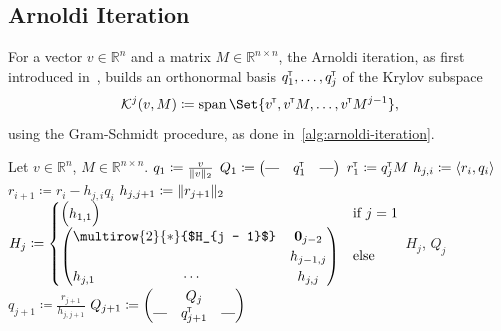 \documentclass[runningheads]{llncs}
\newcommand*{\bbR}{\mathbb{R}}
\newcommand*{\hpipe}{\rotatebox[origin=c]{90}{$|$}}
\newcommand*{\transp}{^{\mkern-1.5mu{\scriptscriptstyle\mathsf{T}}}}
\DeclareMathOperator{\spn}{span}
\DeclarePairedDelimiter{\norm}{\lVert}{\rVert}
\DeclarePairedDelimiter{\inp}{\langle}{\rangle}
\begin{document}
\subsection{Arnoldi Iteration}\label{subsec:arnoldi-iteration}
For a vector $v \in \bbR^n$ and a matrix $M \in \bbR^{n \times n}$, the Arnoldi iteration, as first introduced in~\cite{arnoldi1951iteration}, builds an orthonormal basis $q_1\transp, \dots, q_j\transp$ of the Krylov subspace
\[
    \mathcal{K}^j(v, M) \coloneqq \spn\Set{v\transp, v\transp M, \dots, v\transp M^{j - 1}},
\]
using the Gram-Schmidt procedure, as done in~\cref{alg:arnoldi-iteration}.
\begin{algorithm}[ht]
    \caption{Arnoldi Iteration}\label{alg:arnoldi-iteration}
    \begin{algorithmic}[1]
        \State Let $v \in \bbR^n$, $M \in \bbR^{n \times n}$.
        \State $q_1 \coloneqq \frac{v}{\norm{v}_2}$
        \State $Q_1 \coloneqq \begin{pmatrix}\hpipe & q_1\transp & \hpipe\end{pmatrix}$
            \State $r_1\transp \coloneqq q_j\transp M$
                \State $h_{j, i} \coloneqq \inp{r_i, q_i}$
                \State $r_{i + 1} \coloneqq r_i - h_{j, i} q_i$
            \EndFor
            \State $h_{j, j + 1} \coloneqq \norm{r_{j + 1}}_2$
            \State $H_j \coloneqq
            \begin{cases}
                \begin{pmatrix}h_{1,1}\end{pmatrix} & \text{if $j = 1$}\\
                \begin{pmatrix}
                \multicolumn{2}{c}{\multirow{2}{*}{$H_{j - 1}$}} & \mathbf{0}_{j - 2}\\
                &&h_{j - 1, j}\\
                h_{j, 1} & \cdots & h_{j,j}
            \end{pmatrix} & \text{else}
            \end{cases}$
                \Return $H_j$, $Q_j$
            \EndIf
            \State $q_{j + 1} \coloneqq \frac{r_{j + 1}}{h_{j, j + 1}}$
            \State $Q_{j + 1} \coloneqq \begin{pmatrix}&Q_j&\\\hpipe & q_{j + 1}\transp & \hpipe\end{pmatrix}$
        \EndFor
    \end{algorithmic}
\end{algorithm}
\end{document}
